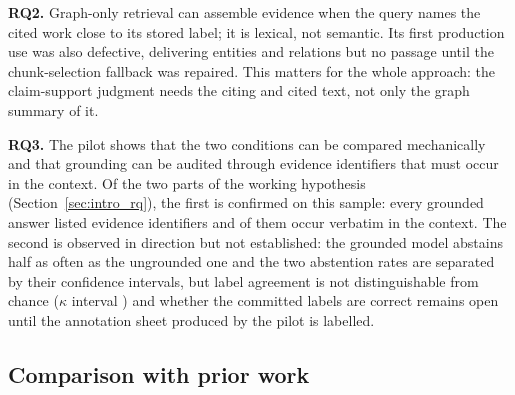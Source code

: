 \documentclass[lettersize,journal]{IEEEtran}
\begin{document}
\textbf{RQ2.} Graph-only retrieval can assemble evidence when the query names the cited work close to its stored label; it is lexical, not semantic. Its first production use was also defective, delivering entities and relations but no passage until the chunk-selection fallback was repaired. This matters for the whole approach: the claim-support judgment needs the citing and cited text, not only the graph summary of it.

\textbf{RQ3.} The pilot shows that the two conditions can be compared mechanically and that grounding can be audited through evidence identifiers that must occur in the context. Of the two parts of the working hypothesis (Section~\ref{sec:intro_rq}), the first is confirmed on this sample: every grounded answer listed evidence identifiers and \pilotIdsGroundedPct{} of them occur verbatim in the context. The second is observed in direction but not established: the grounded model abstains half as often as the ungrounded one and the two abstention rates are separated by their confidence intervals, but label agreement is not distinguishable from chance ($\kappa$ interval \pilotKappaCI) and whether the committed labels are correct remains open until the annotation sheet produced by the pilot is labelled.

\subsection{Comparison with prior work}
\end{document}
